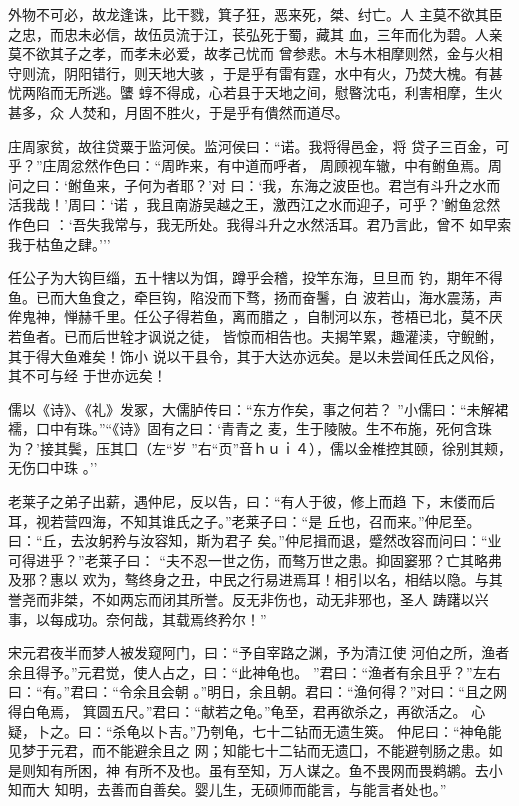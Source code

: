 \documentclass[]{article}
\begin{document}
外物不可必，故龙逢诛，比干戮，箕子狂，恶来死，桀、纣亡。人
主莫不欲其臣之忠，而忠未必信，故伍员流于江，苌弘死于蜀，藏其
血，三年而化为碧。人亲莫不欲其子之孝，而孝未必爱，故孝己忧而
曾参悲。木与木相摩则然，金与火相守则流，阴阳错行，则天地大骇
，于是乎有雷有霆，水中有火，乃焚大槐。有甚忧两陷而无所逃。螴
蜳不得成，心若县于天地之间，慰暋沈屯，利害相摩，生火甚多，众
人焚和，月固不胜火，于是乎有僓然而道尽。

庄周家贫，故往贷粟于监河侯。监河侯曰：``诺。我将得邑金，将
贷子三百金，可乎？''庄周忿然作色曰：``周昨来，有中道而呼者，
周顾视车辙，中有鲋鱼焉。周问之曰：`鲋鱼来，子何为者耶？'对
曰：`我，东海之波臣也。君岂有斗升之水而活我哉！'周曰：`诺
，我且南游吴越之王，激西江之水而迎子，可乎？'鲋鱼忿然作色曰
：`吾失我常与，我无所处。我得斗升之水然活耳。君乃言此，曾不
如早索我于枯鱼之肆。'''

任公子为大钩巨缁，五十犗以为饵，蹲乎会稽，投竿东海，旦旦而
钓，期年不得鱼。已而大鱼食之，牵巨钩，陷没而下骛，扬而奋鬐，白
波若山，海水震荡，声侔鬼神，惮赫千里。任公子得若鱼，离而腊之
，自制河以东，苍梧已北，莫不厌若鱼者。已而后世辁才讽说之徒，
皆惊而相告也。夫揭竿累，趣灌渎，守鲵鲋，其于得大鱼难矣！饰小
说以干县令，其于大达亦远矣。是以未尝闻任氏之风俗，其不可与经
于世亦远矣！

儒以《诗》、《礼》发冢，大儒胪传曰：``东方作矣，事之何若？
''小儒曰：``未解裙襦，口中有珠。''``《诗》固有之曰：`青青之
麦，生于陵陂。生不布施，死何含珠为？'接其鬓，压其囗（左``岁
''右``页''音ｈｕｉ４），儒以金椎控其颐，徐别其颊，无伤口中珠 。''

老莱子之弟子出薪，遇仲尼，反以告，曰：``有人于彼，修上而趋
下，末偻而后耳，视若营四海，不知其谁氏之子。''老莱子曰：``是
丘也，召而来。''仲尼至。曰：``丘，去汝躬矜与汝容知，斯为君子
矣。''仲尼揖而退，蹙然改容而问曰：``业可得进乎？''老莱子曰：
``夫不忍一世之伤，而骜万世之患。抑固窭邪？亡其略弗及邪？惠以
欢为，骜终身之丑，中民之行易进焉耳！相引以名，相结以隐。与其
誉尧而非桀，不如两忘而闭其所誉。反无非伤也，动无非邪也，圣人
踌躇以兴事，以每成功。奈何哉，其载焉终矜尔！''

宋元君夜半而梦人被发窥阿门，曰：``予自宰路之渊，予为清江使
河伯之所，渔者余且得予。''元君觉，使人占之，曰：``此神龟也。
''君曰：``渔者有余且乎？''左右曰：``有。''君曰：``令余且会朝
。''明日，余且朝。君曰：``渔何得？''对曰：``且之网得白龟焉，
箕圆五尺。''君曰：``献若之龟。''龟至，君再欲杀之，再欲活之。
心疑，卜之。曰：``杀龟以卜吉。''乃刳龟，七十二钻而无遗生筴。
仲尼曰：``神龟能见梦于元君，而不能避余且之
网；知能七十二钻而无遗囗，不能避刳肠之患。如是则知有所困，神
有所不及也。虽有至知，万人谋之。鱼不畏网而畏鹈鹕。去小知而大
知明，去善而自善矣。婴儿生，无硕师而能言，与能言者处也。''
\end{document}
